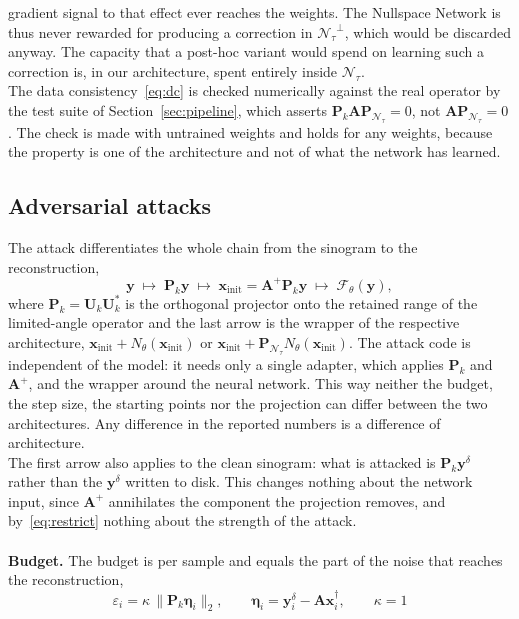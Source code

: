 \documentclass{article}
\numberwithin{equation}{section}
\begin{document}
gradient signal to that effect ever reaches the weights.
The Nullspace Network is thus never rewarded for producing a correction in ${\mathcal{N}_\tau}^{\perp}$,
which would be discarded anyway. The capacity that a post-hoc variant would spend on learning such a correction
is, in our architecture, spent entirely inside $\mathcal{N}_\tau$.\\
The data consistency~\eqref{eq:dc} is checked numerically against the real operator by
the test suite of Section~\ref{sec:pipeline}, which asserts
$\mathbf{P}_k\mathbf{A}\mathbf{P}_{\mathcal{N}_\tau}=0$, not $\mathbf{A}\mathbf{P}_{\mathcal{N}_\tau}=0$. The
check is made with untrained weights and holds for any weights, because the property is one of the
architecture and not of what the network has learned.

\subsection{Adversarial attacks}\label{sec:adversarial}
The attack differentiates the whole chain from the sinogram to the reconstruction,
\[\mathbf{y}\;\longmapsto\;\mathbf{P}_k\mathbf{y}
\;\longmapsto\;\mathbf{x}_\text{init}=\mathbf{A}^+\mathbf{P}_k\mathbf{y}
\;\longmapsto\;\mathcal{F}_\theta(\mathbf{y}),\]
where $\mathbf{P}_k=\mathbf{U}_k\mathbf{U}_k^{*}$
is the orthogonal projector onto the retained range of the limited-angle
operator and the last arrow is the wrapper of the respective architecture,
$\mathbf{x}_\text{init}+N_\theta(\mathbf{x}_\text{init})$ or
$\mathbf{x}_\text{init}+\mathbf{P}_{\mathcal{N}_\tau}N_\theta(\mathbf{x}_\text{init})$.
The attack code is independent of the model: it needs only a single adapter, which applies
$\mathbf{P}_k$ and $\mathbf{A}^{+}$, and the wrapper around the neural network.
This way neither the budget, the step size, the starting points nor the projection can differ
between the two architectures. Any difference in the reported numbers is a difference of architecture.\\
The first arrow also applies to the clean sinogram: what is attacked is $\mathbf{P}_k\mathbf{y}^\delta$
rather than the $\mathbf{y}^\delta$ written to disk. This changes nothing about the network input, since
$\mathbf{A}^{+}$ annihilates the component the projection removes, and by~\eqref{eq:restrict} nothing about
the strength of the attack.\\\\
\textbf{Budget.} The budget is per sample and equals the part of the noise that reaches the reconstruction,
\[\varepsilon_i=\kappa\,\lVert\mathbf{P}_k\boldsymbol{\eta}_i\rVert_2,
\qquad \boldsymbol{\eta}_i=\mathbf{y}^\delta_i-\mathbf{A}\mathbf{x}^\dagger_i,\qquad \kappa=1\]
\end{document}
